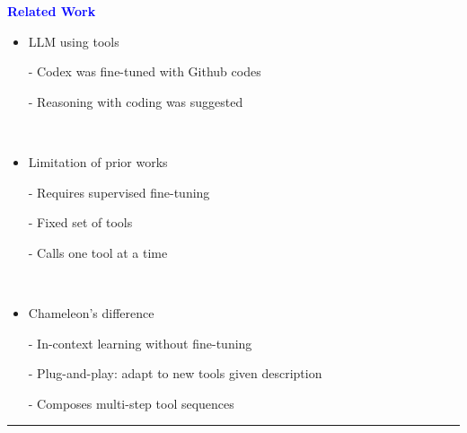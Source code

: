\documentclass[professionalfont]{beamer}
\begin{document}
\begin{frame}
\begin{refsection}

\begin{center}
    { \textbf{\textcolor{blue}{ {\fontsize{12}{14}\selectfont Related Work} }} }
\end{center}

\begin{itemize}
    \item LLM using tools

    - Codex was fine-tuned with Github codes \cite{codex}

    - Reasoning with coding was suggested \cite{PoT}

    \\[0.3cm]

    \item Limitation of prior works

    - Requires supervised fine-tuning

    - Fixed set of tools

    - Calls one tool at a time

    \\[0.3cm]

    \item Chameleon's difference

    - In-context learning without fine-tuning

    - Plug-and-play: adapt to new tools given description

    - Composes multi-step tool sequences

\end{itemize}

\vspace{0.2cm}
\hrule
\printbibliography

\end{refsection}
\end{frame}
\end{document}
